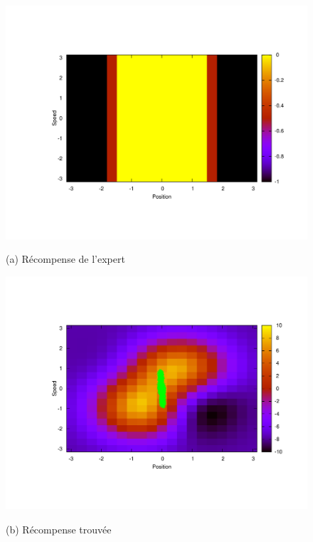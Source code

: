 \documentclass[publibook-draft]{CAp2012}
\begin{document}
\begin{figure}[tb]
%
\begin{minipage}[b]{.5\linewidth}
  \centering
  \centerline{\includegraphics[width=1.2\linewidth]{LAFEM_Exp3_true_R.pdf}}
  \centerline{(a) Récompense de l'expert}%
\end{minipage}
\hfill
\begin{minipage}[b]{.5\linewidth}
  \centering
  \centerline{\includegraphics[width=1.2\linewidth]{LAFEM_Exp3_lafem_R.pdf}}
  \centerline{(b) Récompense trouvée}%
\end{minipage}
\begin{minipage}[b]{.5\linewidth}
  \centering

\end{minipage}
\end{figure}
\end{document}
